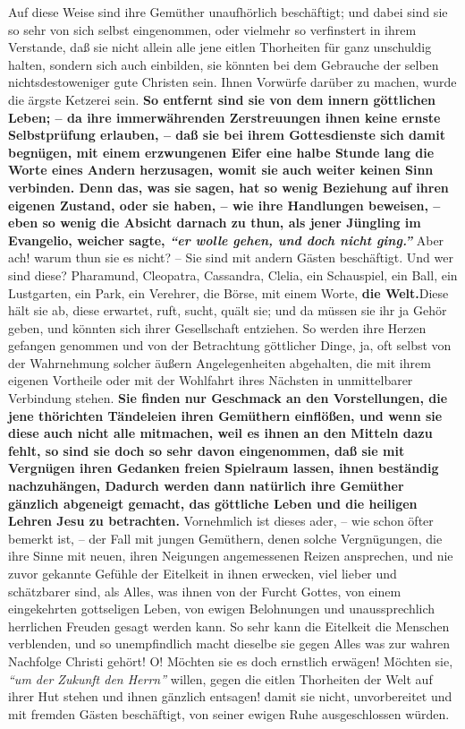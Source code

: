 Auf diese Weise sind ihre Gemüther unaufhörlich beschäftigt; und dabei sind sie
so sehr von sich selbst eingenommen, oder vielmehr so verfinstert in ihrem
Verstande, daß sie nicht allein alle jene eitlen Thorheiten für ganz unschuldig
halten, sondern sich auch einbilden, sie könnten bei dem Gebrauche der selben
nichtsdestoweniger gute Christen sein. Ihnen Vorwürfe
darüber zu machen, wurde
die ärgste Ketzerei sein. \textbf{So entfernt sind sie von dem
innern göttlichen Leben;
-- da ihre immerwährenden Zerstreuungen ihnen keine ernste
Selbstprüfung
erlauben, -- daß sie bei ihrem Gottesdienste
sich damit begnügen, mit einem
erzwungenen Eifer eine halbe Stunde lang die Worte eines Andern herzusagen,
womit sie auch weiter keinen Sinn verbinden. Denn das, was sie sagen, hat so
wenig Beziehung auf ihren eigenen Zustand, oder sie haben, -- wie ihre
Handlungen beweisen, -- eben so wenig die Absicht darnach zu thun, als jener
Jüngling im Evangelio, weicher sagte,
\textit{"`er wolle gehen, und doch nicht ging."'}}
Aber ach! warum thun sie es nicht? -- Sie sind mit andern Gästen beschäftigt.
Und wer sind diese? Pharamund,
Cleopatra, Cassandra,
Clelia, ein Schauspiel, ein
Ball, ein Lustgarten, ein Park, ein Verehrer, die Börse, mit einem
Worte, \textbf{die
Welt.}Diese hält sie ab, diese erwartet, ruft,
sucht, quält sie; und da müssen
sie ihr ja Gehör geben, und könnten sich ihrer Gesellschaft entziehen. So werden
ihre Herzen gefangen genommen und von der Betrachtung göttlicher Dinge, ja, oft
selbst von der Wahrnehmung solcher äußern Angelegenheiten abgehalten, die mit
ihrem eigenen Vortheile oder mit der Wohlfahrt ihres Nächsten in unmittelbarer
Verbindung stehen. \textbf{Sie finden nur Geschmack an den Vorstellungen, die
jene
thörichten Tändeleien ihren Gemüthern einflößen, und wenn sie diese auch nicht
alle mitmachen, weil es ihnen an den Mitteln dazu fehlt, so sind sie doch so
sehr davon eingenommen, daß sie mit Vergnügen ihren Gedanken freien Spielraum
lassen, ihnen beständig nachzuhängen, Dadurch werden dann natürlich ihre
Gemüther gänzlich abgeneigt gemacht, das göttliche Leben und die heiligen Lehren
Jesu zu betrachten.} Vornehmlich ist dieses ader, -- wie schon öfter bemerkt
ist,
-- der Fall mit jungen Gemüthern, denen solche Vergnügungen, die ihre Sinne mit
neuen, ihren Neigungen angemessenen Reizen ansprechen, und nie zuvor gekannte
Gefühle der Eitelkeit in ihnen erwecken, viel lieber und schätzbarer sind, als
Alles, was ihnen von der Furcht Gottes, von einem eingekehrten gottseligen
Leben, von ewigen Belohnungen und unaussprechlich herrlichen Freuden gesagt
werden kann. So sehr kann die Eitelkeit die Menschen verblenden, und so
unempfindlich macht dieselbe sie gegen Alles was zur wahren Nachfolge Christi
gehört! O! Möchten sie es doch ernstlich erwägen! Möchten sie,
\textit{"`um der Zukunft
den Herrn"'} willen, gegen die eitlen Thorheiten der Welt auf ihrer Hut stehen
und ihnen gänzlich entsagen! damit sie nicht, unvorbereitet und mit fremden
Gästen beschäftigt, von seiner ewigen Ruhe ausgeschlossen würden.

